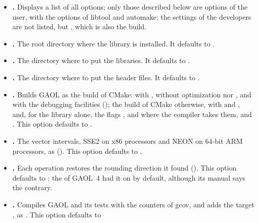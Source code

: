\begin{itemize}
\item[$\bullet$] \textbf{.} Displays a list of all options; only
  those described below are options of the user, with the options of libtool and
  automake; the settings of the developers are not listed, but
  , which is also the  build.
%
\item[$\bullet$] \textbf{.} The root directory
  where the library is installed. It defaults to .
\item[$\bullet$] \textbf{.} The directory where
  to put the libraries. It defaults to .
\item[$\bullet$] \textbf{.} The
  directory where to put the header files. It defaults to
  .
\item[$\bullet$] \textbf{.} Builds GAOL
  as the  build of CMake: with , without optimization
  nor , and with the debugging facilities
  (); the  build of CMake
  otherwise, with  and , and, for the library alone, the
  flags ,  and
   where the compiler takes them, and
  . This option defaults to
  .
%
%
\item[$\bullet$] \textbf{.} The vector
  intervals, SSE2 on x86 processors and NEON on 64-bit ARM processors, as
   (). This option defaults to
  .\newinvfive
\item[$\bullet$] \textbf{.}
  Each operation restores the rounding direction it found
  (). This option defaults to ;\newinvfive{}
  the  of GAOL~4 had it on by default, although its manual says
  the contrary.
%
\item[$\bullet$] \textbf{.} Compiles
  GAOL and its tests with the counters of gcov, and adds the target
  , as . This option defaults to

\end{itemize}
